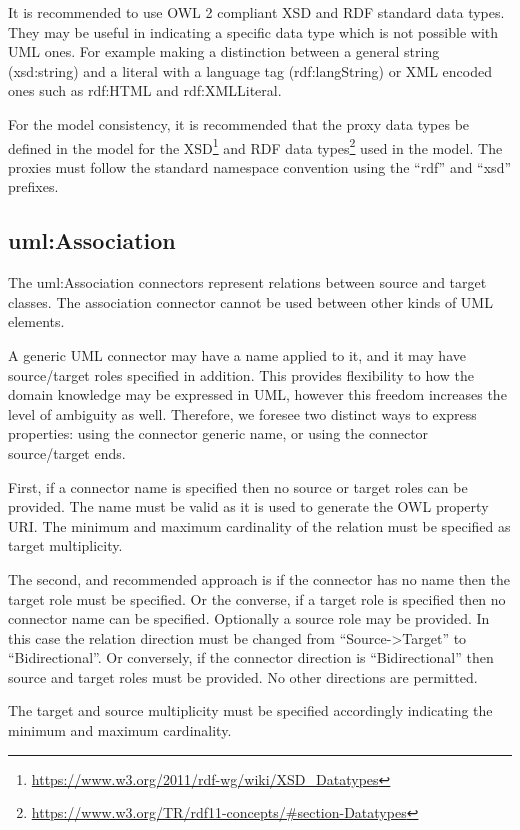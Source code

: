 	It is recommended to use OWL 2 compliant XSD and RDF standard data types. They may be useful in indicating a specific data type which is not possible with UML ones. For example making a distinction between a general string (xsd:string) and a literal with a language tag (rdf:langString) or XML encoded ones such as rdf:HTML and rdf:XMLLiteral.
	
	For the model consistency, it is recommended that the proxy data types be defined in the model for the XSD\footnote{\url{https://www.w3.org/2011/rdf-wg/wiki/XSD_Datatypes}} and RDF data types\footnote{\url{https://www.w3.org/TR/rdf11-concepts/\#section-Datatypes}} used in the model. The proxies must follow the standard namespace convention using the ``rdf'' and ``xsd'' prefixes.

	\subsection{uml:Association}
	\label{sec:association}	
	
	The uml:Association connectors represent relations between source and target classes. The association connector cannot be used between other kinds of UML elements.  
	
	A generic UML connector may have a name applied to it, and it may have source/target roles specified in addition.  This provides flexibility to how the domain knowledge may be expressed in UML, however this freedom increases the level of ambiguity as well. Therefore, we foresee two distinct ways to express properties: using the connector generic name, or using the connector source/target ends. 
	
	First, if a connector name is specified then no source or target roles can be provided. The name must be valid as it is used to generate the OWL property URI. The minimum and maximum cardinality of the relation must be specified as target multiplicity. 
	
	The second, and recommended approach is if the connector has no name then the target role must be specified. Or the converse, if a target role is specified then no connector name can be specified. Optionally a source role may be provided. In this case the relation direction must be changed from ``Source->Target'' to ``Bidirectional''. Or conversely, if the connector direction is ``Bidirectional'' then source and target roles must be provided. No other directions are permitted.
	
	The target and source multiplicity must be specified accordingly indicating the minimum and maximum cardinality. 
	
